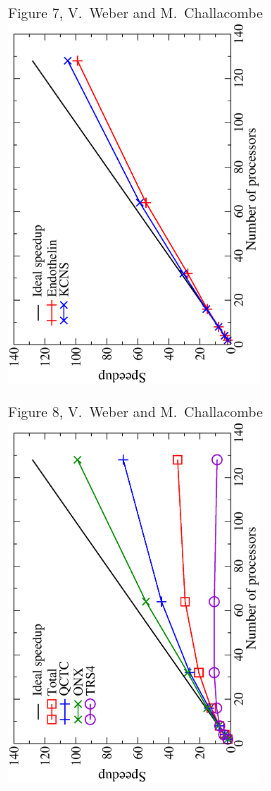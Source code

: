 \documentclass[prl,preprint,doublespace]{revtex4} %
\begin{document}
{\begin{center}
Figure 7, V.~Weber  and M.~Challacombe \\[1.cm]
\includegraphics[angle=-90,width=0.5\textwidth]{Endothelin_KCNS}
\end{center}

\clearpage

\begin{center}
Figure 8, V.~Weber  and M.~Challacombe \\[1.cm]
\includegraphics[angle=-90,width=0.5\textwidth]{EndothelinTotalTiming}
\end{center}

} %

\end{document}
